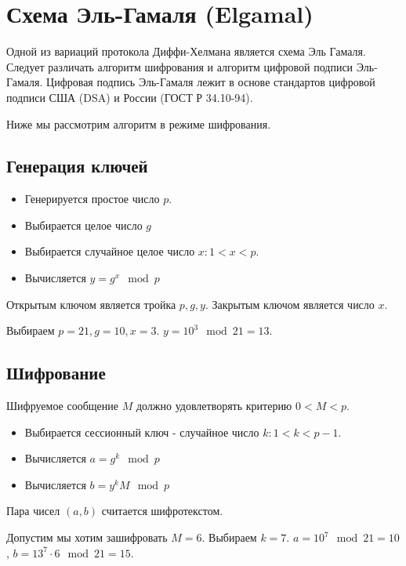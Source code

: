 \section{Схема Эль-Гамаля (Elgamal)}
\label{sec:add:dm:elgamal}
Одной из вариаций протокола Диффи-Хелмана является схема Эль
Гамаля. Следует различать алгоритм шифрования и алгоритм цифровой
подписи Эль-Гамаля. Цифровая подпись Эль-Гамаля лежит в основе
стандартов цифровой подписи США (DSA) и России (ГОСТ Р 34.10-94).

Ниже мы рассмотрим алгоритм в режиме шифрования.

\subsection{Генерация ключей}

\begin{itemize}
\item Генерируется простое число $p$.
\item Выбирается целое число $g$
\item Выбирается случайное целое число $x: 1 < x < p$.
\item Вычисляется $y = g^x \mod p$
\end{itemize}

Открытым ключом  является тройка $p, g, y$. Закрытым ключом является
число $x$.

\begin{example}
Выбираем $p = 21, g = 10, x = 3$. $y = 10^3 \mod 21 = 13$.
\label{ex:add:dm:elgamal_gen}
\end{example}

\subsection{Шифрование}
Шифруемое сообщение $M$ должно удовлетворять критерию $0 < M < p$.
\begin{itemize}
\item Выбирается сессионный ключ - случайное число $k: 1 < k < p - 1$.
\item Вычисляется $a = g^k \mod p$
\item Вычисляется $b = y^k M \mod p$
\end{itemize}

Пара чисел $(a, b)$ считается шифротекстом.
\begin{example}
Допустим мы хотим зашифровать $M=6$.
Выбираем $k = 7$. $a = 10^7 \mod 21 = 10$, $b = 13^7 \cdot 6 \mod 21 =
15$.
\label{ex:add:dm:elgamal_crypt}
\end{example}


